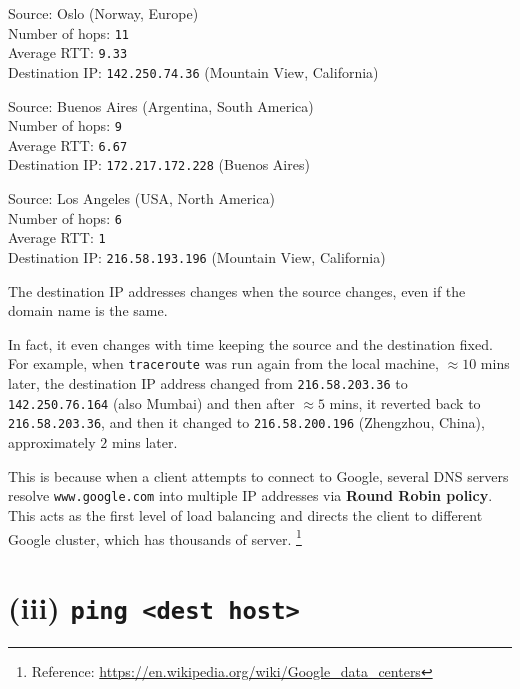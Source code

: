 \documentclass[11pt, fleqn]{article}
\begin{document}
\hrulefill
\smallskip

Source: Oslo (Norway, Europe)\\
Number of hops: \texttt{11}\\
Average RTT: \texttt{9.33}\\
Destination IP: \texttt{142.250.74.36} (Mountain View, California)

\hrulefill
\smallskip

Source: Buenos Aires (Argentina, South America)\\
Number of hops: \texttt{9}\\
Average RTT: \texttt{6.67}\\
Destination IP: \texttt{172.217.172.228} (Buenos Aires)

\hrulefill
\smallskip

Source: Los Angeles (USA, North America)\\
Number of hops: \texttt{6}\\
Average RTT: \texttt{1}\\
Destination IP: \texttt{216.58.193.196} (Mountain View, California)

\hrulefill
\medskip

The destination IP addresses changes when the source changes, even if the domain name is the same.

\smallskip

In fact, it even changes with time keeping the source and the destination fixed.\\ 
For example, when \texttt{traceroute} was run again from the local machine, $\approx 10$ mins later, the destination IP address changed from \texttt{216.58.203.36} to \texttt{142.250.76.164} (also Mumbai) and then after $\approx 5$ mins, it reverted back to \texttt{216.58.203.36}, and then it changed to \texttt{216.58.200.196} (Zhengzhou, China), approximately $2$ mins later.

\smallskip

This is because when a client attempts to connect to Google, several DNS servers resolve \texttt{www.google.com} into multiple IP addresses via \textbf{Round Robin policy}. This acts as the first level of load balancing and directs the client to different Google cluster, which has thousands of server. \footnote{Reference: \url{https://en.wikipedia.org/wiki/Google_data_centers}}


\newpage
\section*{(iii) \texttt{ping <dest host>}}
\label{partc}
\setcounter{equation}{0}
\end{document}
